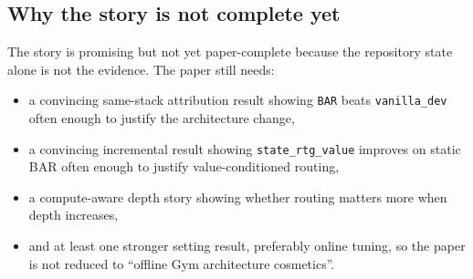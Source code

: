 \documentclass[11pt]{article}
\newcommand{\vanilla}{\texttt{vanilla\_dev}}
\begin{document}
\subsection{Why the story is not complete yet}

The story is promising but not yet paper-complete because the repository state alone is not the evidence. The paper still needs:

\begin{itemize}
  \item a convincing same-stack attribution result showing \texttt{BAR} beats \vanilla{} often enough to justify the architecture change,
  \item a convincing incremental result showing \texttt{state\_rtg\_value} improves on static BAR often enough to justify value-conditioned routing,
  \item a compute-aware depth story showing whether routing matters more when depth increases,
  \item and at least one stronger setting result, preferably online tuning, so the paper is not reduced to ``offline Gym architecture cosmetics''.
\end{itemize}
\end{document}
